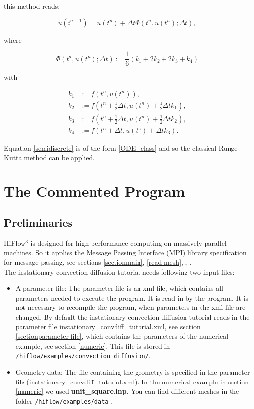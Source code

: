 \documentclass[a4paper, 11pt, twoside]{article}
\begin{document}
this method reads:

	\[u(t^{n+1}) = u(t^{n}) + \Delta t \Phi(t^{n}, u(t^{n}); \Delta t),\]
	
where

	\[\Phi(t^{n}, u(t^{n}); \Delta t) := \frac{1}{6}(k_{1} + 2k_{2} + 2k_{3} + k_{4})\]
	
with

	\begin{align*}
		k_{1} &:= f(t^{n}, u(t^{n})), \\
		k_{2} &:= f\left(t^{n} + \frac{1}{2}\Delta t, u(t^{n}) + \frac{1}{2}\Delta t k_{1}\right), \\
		k_{3} &:= f\left(t^{n} + \frac{1}{2}\Delta t, u(t^{n}) + \frac{1}{2}\Delta t k_{2}\right), \\
		k_{4} &:= f\left(t^{n} + \Delta t, u(t^{n}) + \Delta t k_{3}\right).
	\end{align*}
	
Equation \eqref{semidiscrete} is of the form \eqref{ODE_class} and so the classical Runge-Kutta method can be applied.

\section{The Commented Program}
\subsection{Preliminaries}
HiFlow$^3$ is designed for high performance computing on massively parallel machines. 
So it applies the Message Passing Interface (MPI) library specification for message-passing, see sections \ref{sectionmain}, \ref{read-mesh}, \cite{MPI}, \cite{MPIstandard} .\\
The instationary convection-diffusion tutorial needs following two input files:
\begin{itemize}
\item A parameter file: The parameter file is an xml-file, which contains all parameters needed to execute the program. It is read in by the program. It is not necessary to recompile the program, when parameters in the xml-file are changed. By default the instationary convection-diffusion tutorial reads in the parameter file instationary\_convdiff\_tutorial.xml, see section \ref{sectionparameter file}, which contains the parameters of the numerical example, see section \ref{numeric}. This file is stored in \verb'/hiflow/examples/convection_diffusion/'.  
\item Geometry data: The file containing the geometry is specified in the parameter file (instationary\_convdiff\_tutorial.xml). In the numerical example in section \ref{numeric} we used \textbf{unit\_square.inp}. You can find different meshes in the folder \verb'/hiflow/examples/data' .
\end{itemize}
\end{document}
